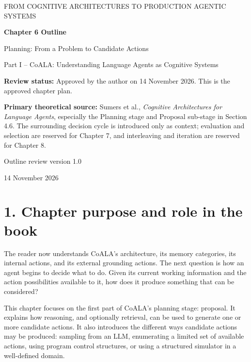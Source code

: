 


\thispagestyle{empty}
\begin{center}
{\sffamily\Large\color{BookBlue} FROM COGNITIVE ARCHITECTURES TO PRODUCTION AGENTIC SYSTEMS\par}
\vspace{1.2cm}
{\sffamily\huge\bfseries\color{BookBlue} Chapter 6 Outline\par}
\vspace{0.45cm}
{\sffamily\LARGE Planning: From a Problem to Candidate Actions\par}
\vspace{0.8cm}
{\large Part I -- CoALA: Understanding Language Agents as Cognitive Systems\par}
\vfill
\begin{learningbox}
\textbf{Review status:} Approved by the author on 14 November 2026. This is the approved chapter plan.

\textbf{Primary theoretical source:} Sumers et al., \emph{Cognitive Architectures for Language Agents}, especially the Planning stage and Proposal sub-stage in Section 4.6. The surrounding decision cycle is introduced only as context; evaluation and selection are reserved for Chapter 7, and interleaving and iteration are reserved for Chapter 8.
\end{learningbox}
\vfill
{\sffamily\large Outline review version 1.0\par}
{\small 14 November 2026\par}
\end{center}
\clearpage

\section*{1. Chapter purpose and role in the book}
The reader now understands CoALA's architecture, its memory categories, its internal actions, and its external grounding actions. The next question is how an agent begins to decide what to do. Given its current working information and the action possibilities available to it, how does it produce something that can be considered?

This chapter focuses on the first part of CoALA's planning stage: proposal. It explains how reasoning, and optionally retrieval, can be used to generate one or more candidate actions. It also introduces the different ways candidate actions may be produced: sampling from an LLM, enumerating a limited set of available actions, using program control structures, or using a structured simulator in a well-defined domain.


